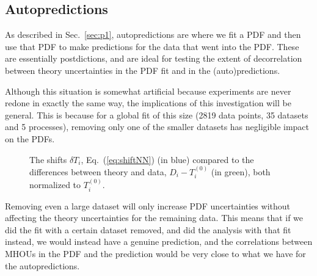 \subsection{Autopredictions}
As described in Sec.~\ref{sec:p1}, autopredictions are where we fit a PDF and then use that PDF to make predictions for the data that went into the PDF. These are essentially postdictions, and are ideal for testing the extent of decorrelation between theory uncertainties in the PDF fit and in the (auto)predictions. 

Although this situation is somewhat artificial because experiments are never redone in exactly the same way, the implications of this investigation will be general. This is because for a global fit of this size (2819 data points, 35 datasets and 5 processes), removing only one of the smaller datasets has negligible impact on the PDFs. 
\begin{figure}[H]
    \begin{center}
    \end{center}
  \vspace{-0.55cm}
  \caption{The shifts $\delta T_i$, Eq.~(\ref{eq:shiftNN}) (in blue) compared to the differences between theory and data, $D_i-T^{(0)}_i$ (in green), both normalized to $T^{(0)}_i$.} 
  \label{fig:shifts}
\end{figure}
Removing even a large dataset will only increase PDF uncertainties without affecting the theory uncertainties for the remaining data. This means that if we did the fit with a certain dataset removed, and did the analysis with that fit instead, we would instead have a genuine prediction, and the correlations between MHOUs in the PDF and the prediction would be very close to what we have for the autopredictions.

